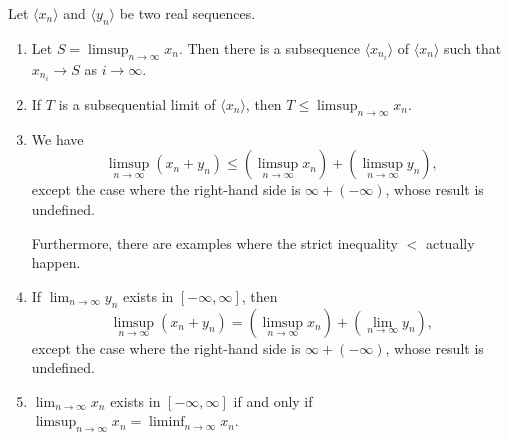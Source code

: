 \begin{prop}
  Let $\langle x_n \rangle$ and $\langle y_n \rangle$ be two real sequences.
  \begin{enumerate}[$(1)$]
    \item Let $\displaystyle S = \limsup_{n \to \infty} x_n$.  Then there is a subsequence $\langle x_{n_i} \rangle$ of $\langle x_n \rangle$ such that $x_{n_i} \to S$ as $i \to \infty$.

    \item If $T$ is a subsequential limit of $\langle x_n \rangle$, then $\displaystyle T \leqslant \limsup_{n \to \infty} x_n$.

    \item We have
      \[
	\limsup_{n \to \infty} (x_n + y_n) \leqslant \left( \limsup_{n \to \infty} x_n \right) + \left( \limsup_{n \to \infty} y_n \right),
      \]
      except the case where the right-hand side is $\infty + (-\infty)$, whose result is undefined.

      Furthermore, there are examples where the strict inequality $<$ actually happen.

    \item If $\displaystyle \lim_{n\to\infty} y_n$ exists in $[-\infty, \infty]$, then
      \[
	\limsup_{n \to \infty} (x_n + y_n) = \left( \limsup_{n \to \infty} x_n \right) + \left( \lim_{n \to \infty} y_n \right),
      \]
      except the case where the right-hand side is $\infty + (-\infty)$, whose result is undefined.
      
    \item $\displaystyle \lim_{n \to \infty} x_n$ exists in $[-\infty, \infty]$ if and only if $\displaystyle \limsup_{n \to \infty} x_n = \liminf_{n \to \infty} x_n$.

  \end{enumerate}
\end{prop}

